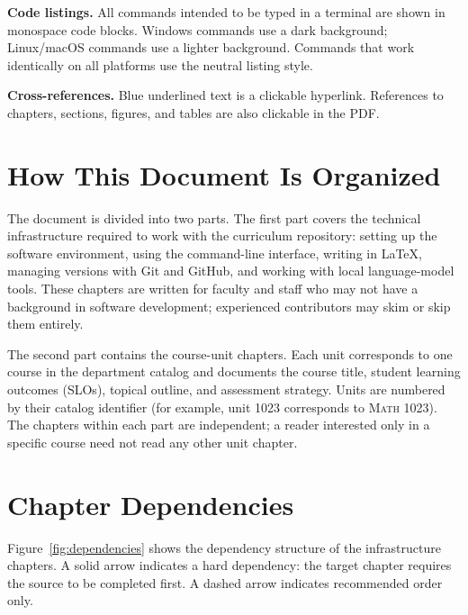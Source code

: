 \noindent
\textbf{Code listings.} All commands intended to be typed in a
terminal are shown in monospace code blocks. Windows commands use a
dark background; Linux/macOS commands use a lighter background.
Commands that work identically on all platforms use the neutral
listing style.

\noindent
\textbf{Cross-references.} Blue underlined text is a clickable
hyperlink. References to chapters, sections, figures, and tables are
also clickable in the PDF.

\section*{How This Document Is Organized}

The document is divided into two parts. The first part covers the
technical infrastructure required to work with the curriculum
repository: setting up the software environment, using the
command-line interface, writing in \LaTeX{}, managing versions with
Git and GitHub, and working with local language-model tools. These
chapters are written for faculty and staff who may not have a
background in software development; experienced contributors may skim
or skip them entirely.

The second part contains the course-unit chapters. Each unit
corresponds to one course in the department catalog and documents the
course title, student learning outcomes (SLOs), topical outline, and
assessment strategy. Units are numbered by their catalog identifier
(for example, unit 1023 corresponds to \textsc{Math 1023}). The
chapters within each part are independent; a reader interested only
in a specific course need not read any other unit chapter.

\section*{Chapter Dependencies}

      \renewcommand{\thefigure}{\arabic{figure}}
      \setcounter{figure}{0}
      Figure~\ref{fig:dependencies} shows the dependency structure of the
      infrastructure chapters. A solid arrow indicates a hard dependency:
      the target chapter requires the source to be completed first. A
      dashed arrow indicates recommended order only.

